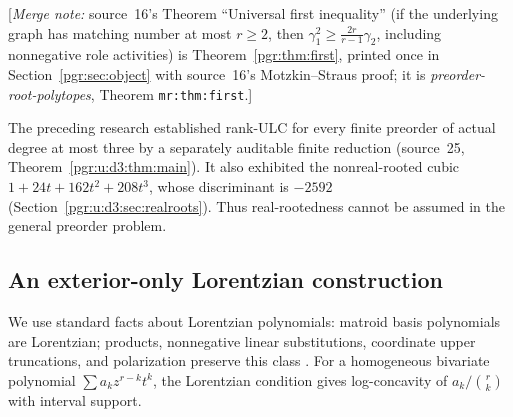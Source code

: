 \documentclass[11pt]{article}
\numberwithin{equation}{section}
\theoremstyle{definition}\newtheorem{definition}[theorem]{Definition}\newtheorem{remark}[theorem]{Remark}
\newcommand{\mnote}[1]{[\textit{Merge note:} #1]}
\newcommand{\prp}{\emph{preorder-root-polytopes}}
\begin{document}
\mnote{source~16's Theorem ``Universal first inequality'' (if the
underlying graph has matching number at most $r\ge2$, then
$\gamma_1^2\ge\frac{2r}{r-1}\gamma_2$, including nonnegative role
activities) is Theorem~\ref{pgr:thm:first}, printed once in
Section~\ref{pgr:sec:object} with source~16's Motzkin--Straus proof; it is
\prp, Theorem \texttt{mr:thm:first}.}

The preceding research established rank-ULC for every finite preorder of actual degree at most three by a separately auditable finite reduction (source~25, Theorem~\ref{pgr:u:d3:thm:main}). It also exhibited the nonreal-rooted cubic
$1+24t+162t^2+208t^3$, whose discriminant is $-2592$ (Section~\ref{pgr:u:d3:sec:realroots}). Thus real-rootedness cannot be assumed in the general preorder problem.

\subsection{An exterior-only Lorentzian construction}
We use standard facts about Lorentzian polynomials: matroid basis polynomials are Lorentzian; products, nonnegative linear substitutions, coordinate upper truncations, and polarization preserve this class \cite{BH,RSW}. For a homogeneous bivariate polynomial $\sum a_k z^{r-k}t^k$, the Lorentzian condition gives log-concavity of $a_k/\binom rk$ with interval support.
\end{document}
